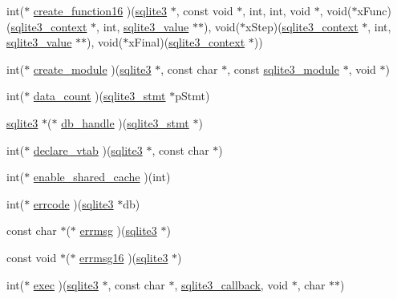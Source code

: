 \begin{DoxyCompactItemize}
\item 
int($\ast$ \hyperlink{structsqlite3__api__routines_a0c3f05b118b89293ff5d35774504b44d}{create\-\_\-function16} )(\hyperlink{structsqlite3}{sqlite3} $\ast$, const void $\ast$, int, int, void $\ast$, void($\ast$x\-Func)(\hyperlink{structsqlite3__context}{sqlite3\-\_\-context} $\ast$, int, \hyperlink{sqlite3_8c_a5bc19e6eab34ccccd953717c04137d88}{sqlite3\-\_\-value} $\ast$$\ast$), void($\ast$x\-Step)(\hyperlink{structsqlite3__context}{sqlite3\-\_\-context} $\ast$, int, \hyperlink{sqlite3_8c_a5bc19e6eab34ccccd953717c04137d88}{sqlite3\-\_\-value} $\ast$$\ast$), void($\ast$x\-Final)(\hyperlink{structsqlite3__context}{sqlite3\-\_\-context} $\ast$))
\item 
int($\ast$ \hyperlink{structsqlite3__api__routines_a25834b37191417562ecd2ee67b85617b}{create\-\_\-module} )(\hyperlink{structsqlite3}{sqlite3} $\ast$, const char $\ast$, const \hyperlink{structsqlite3__module}{sqlite3\-\_\-module} $\ast$, void $\ast$)
\item 
int($\ast$ \hyperlink{structsqlite3__api__routines_aea0a7b7483770202ef9eae88b4eb70cd}{data\-\_\-count} )(\hyperlink{sqlite3_8c_af2a033da1327cdd77f0a174a09aedd0c}{sqlite3\-\_\-stmt} $\ast$p\-Stmt)
\item 
\hyperlink{structsqlite3}{sqlite3} $\ast$($\ast$ \hyperlink{structsqlite3__api__routines_a243ede93aa98a2a339cdd693ca2855e1}{db\-\_\-handle} )(\hyperlink{sqlite3_8c_af2a033da1327cdd77f0a174a09aedd0c}{sqlite3\-\_\-stmt} $\ast$)
\item 
int($\ast$ \hyperlink{structsqlite3__api__routines_a6b6035b36ea9d0800181e69e20059b32}{declare\-\_\-vtab} )(\hyperlink{structsqlite3}{sqlite3} $\ast$, const char $\ast$)
\item 
int($\ast$ \hyperlink{structsqlite3__api__routines_a3e6b7bbdd68cde43ef4afffd73e957ea}{enable\-\_\-shared\-\_\-cache} )(int)
\item 
int($\ast$ \hyperlink{structsqlite3__api__routines_a0f1cf42108e6d872d03b78eaf27dfc45}{errcode} )(\hyperlink{structsqlite3}{sqlite3} $\ast$db)
\item 
const char $\ast$($\ast$ \hyperlink{structsqlite3__api__routines_a8cc92411b7513a1009db9cc75bc486f5}{errmsg} )(\hyperlink{structsqlite3}{sqlite3} $\ast$)
\item 
const void $\ast$($\ast$ \hyperlink{structsqlite3__api__routines_a86767e26b770626fb788af5c7a75af9b}{errmsg16} )(\hyperlink{structsqlite3}{sqlite3} $\ast$)
\item 
int($\ast$ \hyperlink{structsqlite3__api__routines_a16e1fe4f9dccfe8da742d7087822d379}{exec} )(\hyperlink{structsqlite3}{sqlite3} $\ast$, const char $\ast$, \hyperlink{sqlite3_8h_adb558f903738a162410af19b774410fe}{sqlite3\-\_\-callback}, void $\ast$, char $\ast$$\ast$)
$$
\end{DoxyCompactItemize}

